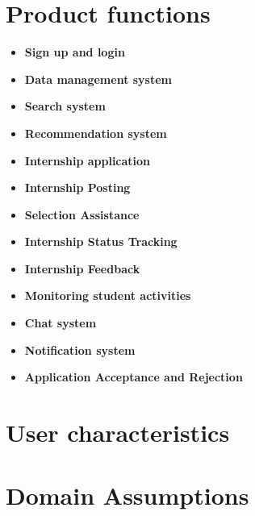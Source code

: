 \section{Product functions}\label{subsec:product_functions}
\begin{itemize}
    \item \textbf{Sign up and login} 
    \item \textbf{Data management system}
    \item \textbf{Search system} 
    \item \textbf{Recommendation system} 
    \item \textbf{Internship application} 
    \item \textbf{Internship Posting}
    \item \textbf{Selection Assistance} 
    \item \textbf{Internship Status Tracking} 
    \item \textbf{Internship Feedback}
    \item \textbf{Monitoring student activities} 
    \item \textbf{Chat system} 
    \item \textbf{Notification system} 
    \item \textbf{Application Acceptance and Rejection} 
\end{itemize}

\section{User characteristics}\label{subsec:user_characteristics}


\section{Domain Assumptions}\label{subsec:domain_assumptions}